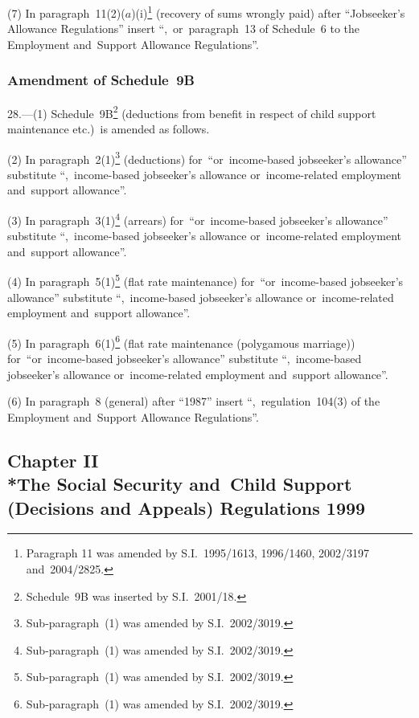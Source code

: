 \documentclass[12pt,a4paper]{article}
\begin{document}
(7) In paragraph~11(2)($a$)(i)\footnote{Paragraph 11 was amended by S.I.~1995/1613, 1996/1460, 2002/3197 and~2004/2825.} (recovery of sums wrongly paid) after “Jobseeker’s Allowance Regulations” insert “,~or~paragraph~13 of Schedule~6 to the Employment and~Support Allowance Regulations”.

\subsubsection[28. Amendment of Schedule~9B]{Amendment of Schedule~9B}

28.---(1)  Schedule~9B\footnote{Schedule~9B was inserted by S.I.~2001/18.} (deductions from benefit in respect of child support maintenance etc.)\ is amended as follows.

(2) In paragraph~2(1)\footnote{Sub-paragraph~(1) was amended by S.I.~2002/3019.} (deductions) for~“or~income-based jobseeker’s allowance” substitute “,~income-based jobseeker’s allowance or~income-related employment and~support allowance”.

(3) In paragraph~3(1)\footnote{Sub-paragraph~(1) was amended by S.I.~2002/3019.} (arrears) for~“or~income-based jobseeker’s allowance” substitute “,~income-based jobseeker’s allowance or~income-related employment and~support allowance”.

(4) In paragraph~5(1)\footnote{Sub-\hspace{0pt}paragraph~(1) was amended by S.I.~2002/3019.} (flat rate maintenance) for~“or~income-based jobseeker’s allowance” substitute “,~income-based jobseeker’s allowance or~income-related employment and~support allowance”.

(5) In paragraph~6(1)\footnote{Sub-paragraph~(1) was amended by S.I.~2002/3019.} (flat rate maintenance (polygamous marriage)) for~“or~income-based jobseeker’s allowance” substitute “,~income-based jobseeker’s allowance or~income-related employment and~support allowance”.

(6) In paragraph~8 (general) after “1987” insert “,~regulation~104(3) of the Employment and~Support Allowance Regulations”.

\subsection[Chapter II --- The Social Security and~Child Support (Decisions and~Appeals) Regulations 1999]{Chapter II\\*The Social Security and~Child Support (Decisions and Appeals) Regulations 1999}
\end{document}
